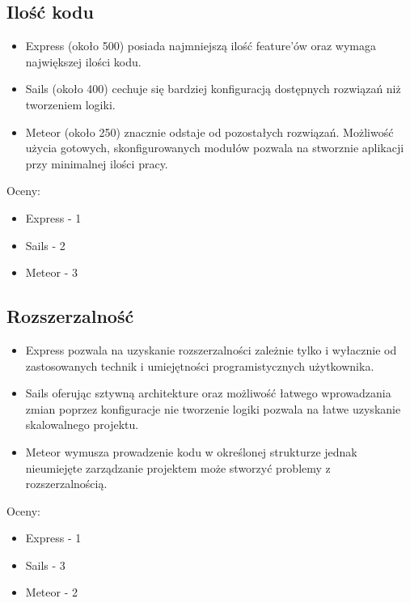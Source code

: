 \documentclass[12pt]{report}
\begin{document}
    \subsection{Ilość kodu}
      \begin{itemize}
        \item Express (około 500) posiada najmniejszą ilość feature'ów oraz wymaga największej ilości kodu.
        \item Sails (około 400) cechuje się bardziej konfiguracją dostępnych rozwiązań niż tworzeniem logiki. 
        \item Meteor (około 250) znacznie odstaje od pozostałych rozwiązań. Możliwość użycia gotowych, skonfigurowanych modułów pozwala na stworznie aplikacji przy minimalnej ilości pracy.
      \end{itemize}
      Oceny:
      \begin{itemize}
        \item Express - 1
        \item Sails - 2
        \item Meteor - 3
      \end{itemize}
      
    \subsection{Rozszerzalność}
      \begin{itemize}
        \item Express pozwala na uzyskanie rozszerzalności zależnie tylko i wyłacznie od zastosowanych technik i umiejętności programistycznych użytkownika.
        \item Sails oferując sztywną architekture oraz możliwość łatwego wprowadzania zmian poprzez konfiguracje nie tworzenie logiki pozwala na łatwe uzyskanie skalowalnego projektu.
        \item Meteor wymusza prowadzenie kodu w określonej strukturze jednak nieumiejęte zarządzanie projektem może stworzyć problemy z rozszerzalnością.
      \end{itemize}
      Oceny:
      \begin{itemize}
        \item Express - 1
        \item Sails - 3
        \item Meteor - 2
      \end{itemize}
\end{document}
